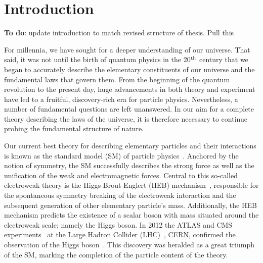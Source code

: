 \chapter{Introduction}
\label{chap:intro}

\textbf{To do}: update introduction to match revised structure of thesis. Pull this

For millennia, we have sought for a deeper understanding of our universe. That said, it was not until the birth of quantum physics in the 20$^{\rm{th}}$ century that we began to accurately describe the elementary constituents of our universe and the fundamental laws that govern them. From the beginning of the quantum revolution to the present day, huge advancements in both theory and experiment have led to a fruitful, discovery-rich era for particle physics. Nevertheless, a number of fundamental questions are left unanswered. In our aim for a complete theory describing the laws of the universe, it is therefore necessary to continue probing the fundamental structure of nature.

Our current best theory for describing elementary particles and their interactions is known as the standard model (SM) of particle physics~\cite{Glashow:1961tr,Weinberg:1967tq,Salam:1968rm}. Anchored by the notion of symmetry, the SM successfully describes the strong force as well as the unification of the weak and electromagnetic forces. Central to this so-called electroweak theory is the Higgs-Brout-Englert (HEB) mechanism~\cite{Englert:1964et,HIGGS1964132,Higgs:1964pj,Guralnik:1964eu,PhysRev.145.1156,PhysRev.155.1554}, responsible for the spontaneous symmetry breaking of the electroweak interaction and the subsequent generation of other elementary particle's mass. Additionally, the HEB mechanism predicts the existence of a scalar boson with mass situated around the electroweak scale; namely the Higgs boson. In 2012 the ATLAS and CMS experiments~\cite{Aad:2008zzm,Chatrchyan:2008zzk} at the Large Hadron Collider (LHC)~\cite{1748-0221-3-08-S08001}, CERN, confirmed the observation of the Higgs boson~\cite{Aad:2012tfa,Chatrchyan:2012xdj,Chatrchyan:2013lba}. This discovery was heralded as a great triumph of the SM, marking the completion of the particle content of the theory.

